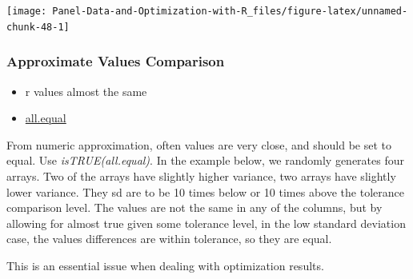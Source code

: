 \documentclass[
]{book}
\providecommand{\tightlist}{%
  \setlength{\itemsep}{0pt}\setlength{\parskip}{0pt}}
\begin{document}
\begin{center}\texttt{[image: Panel-Data-and-Optimization-with-R\_files/figure-latex/unnamed-chunk-48-1]} \end{center}

\hypertarget{approximate-values-comparison}{%
\subsubsection{Approximate Values Comparison}\label{approximate-values-comparison}}

\begin{itemize}
\tightlist
\item
  r values almost the same
\item
  \href{https://stat.ethz.ch/R-manual/R-patched/library/base/html/all.equal.html}{all.equal}
\end{itemize}

From numeric approximation, often values are very close, and should be set to equal. Use \emph{isTRUE(all.equal)}. In the example below, we randomly generates four arrays. Two of the arrays have slightly higher variance, two arrays have slightly lower variance. They sd are to be 10 times below or 10 times above the tolerance comparison level. The values are not the same in any of the columns, but by allowing for almost true given some tolerance level, in the low standard deviation case, the values differences are within tolerance, so they are equal.

This is an essential issue when dealing with optimization results.
\end{document}
